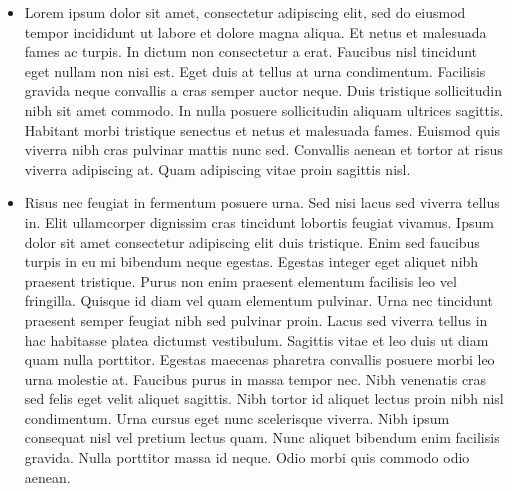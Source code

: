 \documentclass[article]{seminar}
\newcommand{\sltitle}[1]{{\centering\textbf{\Large #1}
    \vskip 2em plus 0pt minus 2em\par}} %
\begin{document}



\begin{itemize}
\item Lorem ipsum dolor sit amet, consectetur adipiscing elit, sed do eiusmod
tempor incididunt ut labore et dolore magna aliqua. Et netus et malesuada fames
ac turpis. In dictum non consectetur a erat. Faucibus nisl tincidunt eget nullam
non nisi est. Eget duis at tellus at urna condimentum. Facilisis gravida neque
convallis a cras semper auctor neque. Duis tristique sollicitudin nibh sit amet
commodo. In nulla posuere sollicitudin aliquam ultrices sagittis. Habitant morbi
tristique senectus et netus et malesuada fames. Euismod quis viverra nibh cras
pulvinar mattis nunc sed. Convallis aenean et tortor at risus viverra adipiscing
at. Quam adipiscing vitae proin sagittis nisl.
\item Risus nec feugiat in fermentum posuere urna. Sed nisi lacus sed viverra
tellus in. Elit ullamcorper dignissim cras tincidunt lobortis feugiat vivamus.
Ipsum dolor sit amet consectetur adipiscing elit duis tristique. Enim sed
faucibus turpis in eu mi bibendum neque egestas. Egestas integer eget aliquet
nibh praesent tristique. Purus non enim praesent elementum facilisis leo vel
fringilla. Quisque id diam vel quam elementum pulvinar. Urna nec tincidunt
praesent semper feugiat nibh sed pulvinar proin. Lacus sed viverra tellus in hac
habitasse platea dictumst vestibulum. Sagittis vitae et leo duis ut diam quam
nulla porttitor. Egestas maecenas pharetra convallis posuere morbi leo urna
molestie at. Faucibus purus in massa tempor nec. Nibh venenatis cras sed felis
eget velit aliquet sagittis. Nibh tortor id aliquet lectus proin nibh nisl
condimentum. Urna cursus eget nunc scelerisque viverra. Nibh ipsum consequat
nisl vel pretium lectus quam. Nunc aliquet bibendum enim facilisis gravida.
Nulla porttitor massa id neque. Odio morbi quis commodo odio aenean.
\end{itemize}


\end{document}
